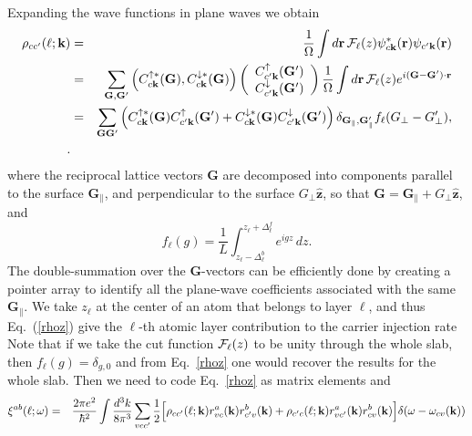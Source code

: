 \documentclass[floatfix,prb,aps,superscriptaddress,11pt]{revtex4}
\begin{document}
Expanding the wave functions in plane waves we obtain
\begin{eqnarray}\label{rhoz}
\rho_{cc'}(\ell;\mathbf{k})
&=&
\frac{1}{\Omega}\int d\mathbf{r}\, {\cal F}_\ell(z)
\psi_{c\mathbf{k}}^*(\mathbf{r})
\psi_{c'\mathbf{k}}(\mathbf{r})
\nonumber\\
&=&
\sum_{\mathbf{G},\mathbf{G}'} 
                          \left(
                                C^{\uparrow *}_{c\mathbf{k}}(\mathbf{G}),
                               C^{\downarrow *}_{c\mathbf{k}}(\mathbf{G})
                                \right) 
                         \left(\begin{array}{c}
                                C^{\uparrow}_{c'\mathbf{k}}(\mathbf{G}')\\
                               C^{\downarrow}_{c'\mathbf{k}}(\mathbf{G}')\\
                                \end{array}\right) 
\frac{1}{\Omega}\int d\mathbf{r}\, {\cal F}_\ell(z)
e^{i(\mathbf{G}-\mathbf{G}')\cdot\mathbf{r}}
\nonumber\\
&=&
\sum_{\mathbf{G}\mathbf{G}'}
\left(
C^{\uparrow *}_{c\mathbf{k}}(\mathbf{G}) C^{\uparrow}_{c'\mathbf{k}}(\mathbf{G}')
+
C^{\downarrow *}_{c\mathbf{k}}(\mathbf{G}) C^{\downarrow}_{c'\mathbf{k}}(\mathbf{G}') 
\right)
\delta_{\mathbf{G}_{\|},\mathbf{G}'_{\parallel}}
f_\ell(G_\perp - G^{\prime}_\perp),
\nonumber\\
.
\end{eqnarray} 
where the reciprocal lattice vectors $\mathbf{G}$ are decomposed
into components parallel to the surface $\mathbf{G}_\parallel$,
and perpendicular to the surface $G_\perp \hat{\mathbf{z}}$, so
that $\mathbf{G} = \mathbf{G}_\parallel + G_\perp \hat{\mathbf{z}}$,
and
\begin{equation} \label{four}
f_{\ell}(g) =\frac{1}{L} \int_{z_\ell-\Delta_\ell^b}^{z_\ell+\Delta_\ell^f}
e^{igz}\,dz.
\end{equation}
The double-summation over the $\mathbf{G}$-vectors can be
efficiently done by creating a pointer array to identify all the
plane-wave coefficients associated with the same
$\mathbf{G}_\parallel$. 
We take $z_\ell$ at the center of an atom that belongs to layer 
$\ell$, and thus Eq.~(\ref{rhoz}) give
the $\ell$-th atomic layer contribution to the carrier injection rate 
Note that if we take the 
cut function ${\cal F}_\ell(z)$ to be unity through the whole slab, 
then $f_{\ell}(g)=\delta_{g,0}$ and from Eq.~\eqref{rhoz} one 
would recover the  results for the whole slab. Then we need to code
Eq.~\eqref{rhoz} as matrix elements and
\begin{eqnarray}\label{xizm1}
\xi^{ab}(\ell;\omega)&=&
\frac{2\pi e^2}{\hbar^2}
\int\frac{d^3k}{8\pi^3}
\sum_{vcc'}
\frac{1}{2}\Big[
\rho_{cc'}(\ell;\mathbf{k})    
r^a_{vc} 
(\mathbf{k})  
r^b_{c'v}
(\mathbf{k})
+
\rho_{c'c}(\ell;\mathbf{k}) 
r^a_{vc'} 
(\mathbf{k})  
r^b_{cv}
(\mathbf{k})
\Big]
\delta(\omega-\omega_{cv}(\mathbf{k})
)
\end{eqnarray}     
\end{document}
